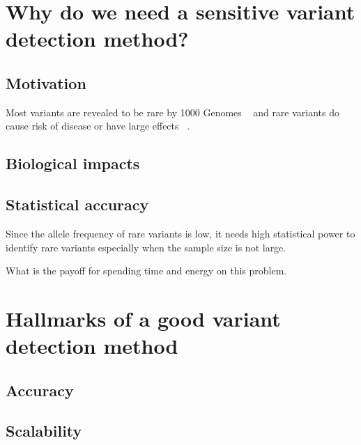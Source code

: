 \documentclass[11pt,reqno]{amsart}
\begin{document}
\section{Why do we need a sensitive variant detection method?}

\subsection{Motivation}
Most variants are revealed to be rare by 1000 Genomes ~\citep{10002010map} and rare variants do cause risk of disease or have large effects ~\citep{kosmicki2016discovery}.

\subsection{Biological impacts}


\subsection{Statistical accuracy}
Since the allele frequency of rare variants is low, it needs high statistical power to identify rare variants especially when the sample size is not large.

What is the payoff for spending time and energy on this problem.




\section{Hallmarks of a good variant detection method}
\subsection{Accuracy}

\subsection{Scalability}
\end{document}
